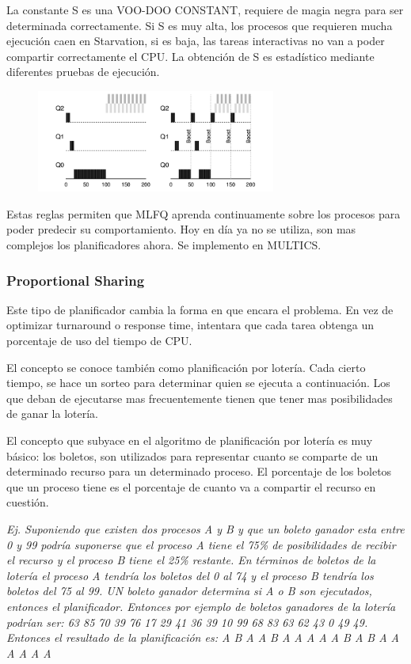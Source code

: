 \documentclass[titlepage,a4paper]{article}
\begin{document}
La constante S es una VOO-DOO CONSTANT, requiere de magia negra para ser determinada correctamente. Si S es muy alta, los procesos que requieren mucha ejecución caen en Starvation, si es baja, las tareas interactivas no van a poder compartir correctamente el CPU. La obtención de S es estadístico mediante diferentes pruebas de ejecución.

\begin{figure}[!htb]
    \centering
    \includegraphics[width=0.7\textwidth]{ImagenesApunte/mlfq_boost.jpg}
\end{figure}

Estas reglas permiten que MLFQ aprenda continuamente sobre los procesos para poder predecir su comportamiento. Hoy en día ya no se utiliza, son mas complejos los planificadores ahora. Se implemento en MULTICS.


\subsubsection*{Proportional Sharing}
Este tipo de planificador cambia la forma en que encara el problema. En vez de optimizar turnaround o response time, intentara que cada tarea obtenga un porcentaje de uso del tiempo de CPU.

El concepto se conoce también como planificación por lotería. Cada cierto tiempo, se hace un sorteo para determinar quien se ejecuta a continuación. Los que deban de ejecutarse mas frecuentemente tienen que tener mas posibilidades de ganar la lotería.

El concepto que subyace en el algoritmo de planificación por lotería es muy básico: los boletos, son utilizados para representar cuanto se comparte de un determinado recurso para un determinado proceso. El porcentaje de los boletos que un proceso tiene es el porcentaje de cuanto va a compartir el recurso en cuestión.

\textit{Ej. Suponiendo que existen dos procesos A y B y que un boleto ganador esta entre 0 y 99 podría suponerse que el proceso A tiene el 75\% de posibilidades de recibir el recurso y el proceso B tiene el 25\% restante. En términos de boletos de la lotería el proceso A tendría los boletos del 0 al 74 y el proceso B tendría los boletos del 75 al 99. UN boleto ganador determina si A o B son ejecutados, entonces el planificador. Entonces por ejemplo de boletos ganadores de la lotería podrían ser: 63 85 70 39 76 17 29 41 36 39 10 99 68 83 63 62 43 0 49 49. Entonces el resultado de la planificación es:
A B A A B A A A A A B A B A A A A A A}
\end{document}
